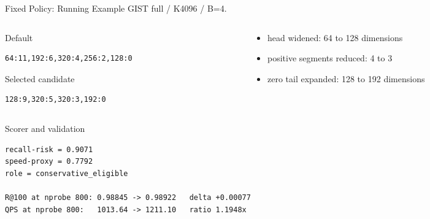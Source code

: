 \documentclass[aspectratio=169,10pt]{beamer}
\begin{document}
\begin{frame}[fragile]{Fixed Policy: Running Example}
\small
GIST full / K4096 / B=4.

\begin{columns}[T,totalwidth=\textwidth]
\begin{column}{0.48\textwidth}
\begin{block}{Default}
\begin{lstlisting}
64:11,192:6,320:4,256:2,128:0
\end{lstlisting}
\end{block}
\begin{block}{Selected candidate}
\begin{lstlisting}
128:9,320:5,320:3,192:0
\end{lstlisting}
\end{block}
\end{column}
\begin{column}{0.48\textwidth}
\begin{itemize}
  \item head widened: 64 to 128 dimensions
  \item positive segments reduced: 4 to 3
  \item zero tail expanded: 128 to 192 dimensions
\end{itemize}
\end{column}
\end{columns}

\vspace{0.8em}
\begin{block}{Scorer and validation}
\begin{lstlisting}
recall-risk = 0.9071
speed-proxy = 0.7792
role = conservative_eligible

R@100 at nprobe 800: 0.98845 -> 0.98922   delta +0.00077
QPS at nprobe 800:   1013.64 -> 1211.10   ratio 1.1948x
\end{lstlisting}
\end{block}
\end{frame}
\end{document}
